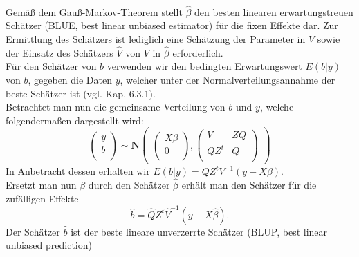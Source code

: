 \documentclass[%
thesis=student,%
coverpage=false,%
titlepage=false,%
headmarks=true, %
german,%
font=libertine, %
math=newpxtx, %
BCOR=5mm,%
coverBCOR=11mm%
]{tumbook}
\theoremstyle{break}
\begin{document}
\\
Gemäß dem Gauß-Markov-Theorem stellt $\hat{\beta}$ den besten linearen erwartungstreuen Schätzer (BLUE, best linear unbiased estimator) für die fixen Effekte dar. Zur Ermittlung des Schätzers ist lediglich eine Schätzung der Parameter in $V$ sowie der Einsatz des Schätzers $\hat{V} $ von $V$ in $\hat{\beta}$ erforderlich. \\
Für den Schätzer von $b$ verwenden wir den bedingten Erwartungswert $E(b|y)$ von $b$, gegeben die Daten $y$, welcher unter der Normalverteilungsannahme der beste Schätzer ist (vgl. \cite{fahrmeir-2011-regression} Kap. 6.3.1). \\
Betrachtet man nun die gemeinsame Verteilung von $b$ und $y$, welche folgendermaßen dargestellt wird:
$$\begin{pmatrix}
	y \\
	b \\
\end{pmatrix}
\sim
\mathbf{N}
\begin{pmatrix}
	\begin{pmatrix}
		X\beta \\
		0 \\
	\end{pmatrix},
	\begin{pmatrix}
		V & Z Q \\
		Q Z^t & Q \\
	\end{pmatrix}
\end{pmatrix}$$
In Anbetracht dessen erhalten wir $E(b|y) = Q Z^tV^{-1}(y-X\beta)$. \\
Ersetzt man nun $\beta$ durch den Schätzer $\hat{\beta}$ erhält man den Schätzer für die zufälligen Effekte $$\hat{b} = \hat{Q} Z^t\hat{V}^{-1}(y-X\hat{\beta}).$$ Der Schätzer $\hat{b}$ ist der beste lineare unverzerrte Schätzer (BLUP, best linear unbiased prediction)\\
\end{document}
